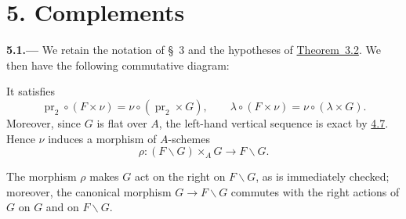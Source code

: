 
\section*{5. Complements}
\label{sec:sga3-VIA-5}

\medskip
{}\label{par:sga3-VIA-5.1}%
\noindent\textbf{5.1.---}
We retain the notation of \S~3 and the hypotheses of \hyperref[thm:sga3-VIA-3.2]{Theorem~3.2}.
We then have the following commutative diagram:
\begin{center}
  \label{diag:sga3-VIA-5.1-right-action}%
\end{center}
It satisfies
\[
  \operatorname{pr}_2\circ(F\times\nu)
    =
  \nu\circ(\operatorname{pr}_2\times G),
  \qquad
  \lambda\circ(F\times\nu)
    =
  \nu\circ(\lambda\times G).
\]
Moreover, since \(G\) is flat over \(A\), the left-hand vertical
sequence is exact by \hyperref[par:sga3-VIA-4.7]{4.7}. Hence \(\nu\) induces a morphism of
\(A\)-schemes
\[
  \rho:(F\backslash G)\times_A G\longrightarrow F\backslash G.
\]

The morphism \(\rho\) makes \(G\) act on the right on
\(F\backslash G\), as is immediately checked; moreover, the
canonical morphism \(G\to F\backslash G\) commutes with the right
actions of \(G\) on \(G\) and on \(F\backslash G\).
